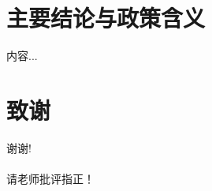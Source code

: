 \documentclass{beamer}
\begin{document}
	\section{主要结论与政策含义}
	\begin{frame}{}
		内容...
	\end{frame}
	
	\section*{致谢}  
	\begin{frame}
		\begin{center}
			\textcolor{myNewColorA}{\huge {谢谢!\\ \quad \\ 请老师批评指正！}}
		\end{center}
	\end{frame}
	
\end{document}
